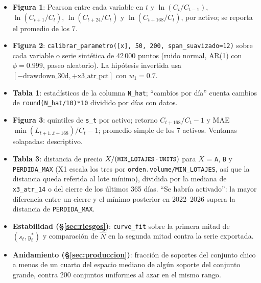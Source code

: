 \documentclass[11pt,a4paper]{article}
\newcommand{\code}[1]{\texttt{\small #1}}
\begin{document}
\begin{itemize}[leftmargin=1.2em]
  \item \textbf{Figura 1}: Pearson entre cada variable en $t$ y $\ln(C_t/C_{t-1})$, $\ln(C_{t+1}/C_t)$,
        $\ln(C_{t+24}/C_t)$ y $\ln(C_{t+168}/C_t)$, por activo; se reporta el promedio de los 7.
  \item \textbf{Figura 2}: \code{calibrar\_parametro([x], 50, 200, span\_suavizado=12)} sobre cada
        variable o serie sintética de 42\,000 puntos (ruido normal, AR(1) con $\phi=0.999$, paseo aleatorio).
        La hipótesis invertida usa $[-\text{drawdown\_30d}, +\text{x3\_atr\_pct}]$ con $w_1=0.7$.
  \item \textbf{Tabla 1}: estadísticos de la columna \code{N\_hat}; ``cambios por día'' cuenta cambios de
        \code{round(N\_hat/10)*10} dividido por días con datos.
  \item \textbf{Figura 3}: quintiles de \code{s\_t} por activo; retorno $C_{t+168}/C_t-1$ y MAE
        $\min(L_{t+1..t+168})/C_t-1$; promedio simple de los 7 activos. Ventanas solapadas: descriptivo.
  \item \textbf{Tabla 3}: distancia de precio $X/(\code{MIN\_LOTAJES}\cdot\code{UNITS})$ para $X$ =
        \code{A}, \code{B} y \code{PERDIDA\_MAX} (X1 escala los tres por \code{orden.volume/MIN\_LOTAJES}, así
        que la distancia queda referida al lote mínimo), dividida por la mediana de \code{x3\_atr\_14} o del
        cierre de los últimos 365 días. ``Se habría activado'': la mayor diferencia entre un cierre y el
        mínimo posterior en 2022--2026 supera la distancia de \code{PERDIDA\_MAX}.
  \item \textbf{Estabilidad (§\ref{sec:riesgos})}: \code{curve\_fit} sobre la primera mitad de
        $(s_t, y^*_t)$ y comparación de $\hat N$ en la segunda mitad contra la serie exportada.
  \item \textbf{Anidamiento (§\ref{sec:produccion})}: fracción de soportes del conjunto chico a menos de
        un cuarto del espacio mediano de algún soporte del conjunto grande, contra 200 conjuntos uniformes
        al azar en el mismo rango.
\end{itemize}
\end{document}
